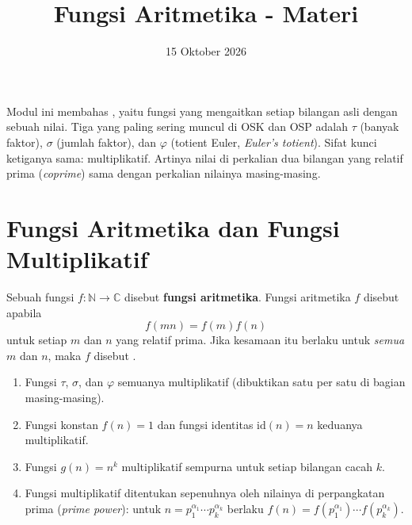\documentclass[12pt]{scrartcl}
\title{Fungsi Aritmetika - Materi}
\date{15 Oktober 2026}
\begin{document}
\maketitle

\renewcommand*\contentsname{Daftar Isi}
\tableofcontents

\newpage

Modul ini membahas , yaitu fungsi
yang mengaitkan setiap bilangan asli dengan sebuah nilai. Tiga yang paling sering
muncul di OSK dan OSP adalah $\tau$ (banyak faktor), $\sigma$ (jumlah faktor),
dan $\varphi$ (totient Euler, \textit{Euler's totient}).
Sifat kunci ketiganya sama: multiplikatif. Artinya nilai di perkalian dua bilangan
yang relatif prima (\textit{coprime}) sama dengan perkalian nilainya masing-masing.

\section{Fungsi Aritmetika dan Fungsi Multiplikatif}

\begin{definition}
Sebuah fungsi $f : \mathbb{N} \to \mathbb{C}$ disebut \textbf{fungsi aritmetika}.
Fungsi aritmetika $f$ disebut  apabila
\[ f(mn) = f(m)f(n) \]
untuk setiap $m$ dan $n$ yang relatif prima. Jika kesamaan itu berlaku untuk
\emph{semua} $m$ dan $n$, maka $f$ disebut .
\end{definition}

\begin{fact}
\begin{enumerate}
    \item Fungsi $\tau$, $\sigma$, dan $\varphi$ semuanya multiplikatif
    (dibuktikan satu per satu di bagian masing-masing).
    \item Fungsi konstan $f(n) = 1$ dan fungsi identitas $\text{id}(n) = n$
    keduanya multiplikatif.
    \item Fungsi $g(n) = n^k$ multiplikatif sempurna untuk setiap bilangan cacah $k$.
    \item Fungsi multiplikatif ditentukan sepenuhnya oleh nilainya di perpangkatan
    prima (\textit{prime power}): untuk $n = p_1^{\alpha_1} \cdots p_k^{\alpha_k}$ berlaku
    $f(n) = f(p_1^{\alpha_1}) \cdots f(p_k^{\alpha_k})$.
\end{enumerate}
\end{fact}
\end{document}

